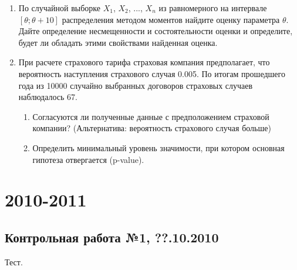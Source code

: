 \documentclass[12pt, a4paper]{article}\usepackage[]{graphicx}\usepackage[]{color}
\begin{document}
\begin{enumerate}
		\item По случайной выборке $X_1$, $X_2$, ..., $X_n$ из равномерного на интервале $[\theta;\theta+10]$ распределения методом моментов найдите оценку параметра $\theta$. Дайте определение несмещенности и состоятельности оценки и определите, будет ли обладать этими свойствами найденная оценка.

		\item При расчете страхового тарифа страховая компания предполагает, что вероятность наступления страхового случая 0.005. По итогам прошедшего года из 10000 случайно выбранных договоров страховых случаев наблюдалось 67.
		\begin{enumerate}
			\item Согласуются ли полученные данные с предположением страховой компании? (Альтернатива: вероятность страхового случая больше)
			\item Определить минимальный уровень значимости, при котором основная гипотеза отвергается (p-value).
		\end{enumerate}
	\end{enumerate}



	\section{2010-2011}



	\subsection{Контрольная работа №1, ??.10.2010}

	Тест.
\end{document}
